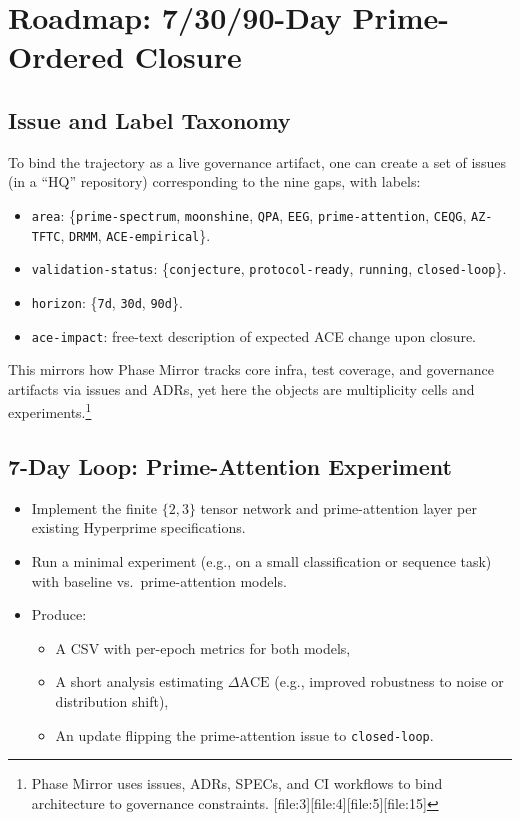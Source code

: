 \documentclass[11pt]{article}
\begin{document}
\newpage

\section{Roadmap: 7/30/90-Day Prime-Ordered Closure}

\subsection{Issue and Label Taxonomy}

To bind the trajectory as a live governance artifact, one can create a set of issues (in a ``HQ'' repository) corresponding to the nine gaps, with labels:

\begin{itemize}[leftmargin=*]
  \item \texttt{area}: \{\texttt{prime-spectrum}, \texttt{moonshine}, \texttt{QPA}, \texttt{EEG}, \texttt{prime-attention}, \texttt{CEQG}, \texttt{AZ-TFTC}, \texttt{DRMM}, \texttt{ACE-empirical}\}.
  \item \texttt{validation-status}: \{\texttt{conjecture}, \texttt{protocol-ready}, \texttt{running}, \texttt{closed-loop}\}.
  \item \texttt{horizon}: \{\texttt{7d}, \texttt{30d}, \texttt{90d}\}.
  \item \texttt{ace-impact}: free-text description of expected ACE change upon closure.
\end{itemize}

This mirrors how Phase Mirror tracks core infra, test coverage, and governance artifacts via issues and ADRs, yet here the objects are multiplicity cells and experiments.\footnote{Phase Mirror uses issues, ADRs, SPECs, and CI workflows to bind architecture to governance constraints. [file:3][file:4][file:5][file:15]}

\subsection{7-Day Loop: Prime-Attention Experiment}

\begin{itemize}[leftmargin=*]
  \item Implement the finite \(\{2,3\}\) tensor network and prime-attention layer per existing Hyperprime specifications.
  \item Run a minimal experiment (e.g., on a small classification or sequence task) with baseline vs.\ prime-attention models.
  \item Produce:
    \begin{itemize}
      \item A CSV with per-epoch metrics for both models,
      \item A short analysis estimating \(\Delta\mathrm{ACE}\) (e.g., improved robustness to noise or distribution shift),
      \item An update flipping the prime-attention issue to \texttt{closed-loop}.
    \end{itemize}
\end{itemize}
\end{document}
